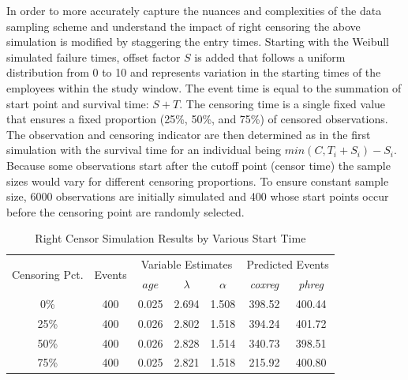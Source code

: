 In order to more accurately capture the nuances and complexities of the data sampling scheme and understand the impact of right censoring the above simulation is modified by staggering the entry times. Starting with the Weibull simulated failure times, offset factor $S$ is added that follows a uniform distribution from 0 to 10 and represents variation in the starting times of the employees within the study window. The event time is equal to the summation of start point and survival time: $S+T$. The censoring time is a single fixed value that ensures a fixed proportion (25\%, 50\%, and 75\%) of censored observations.  The observation and censoring indicator are then determined as in the first simulation with the survival time for an individual being $min(C,T_i+S_i) - S_i$. Because some observations start after the cutoff point (censor time) the sample sizes would vary for different censoring proportions.  To ensure constant sample size, 6000 observations are initially simulated and 400 whose start points occur before the censoring point are randomly selected.
\begin{table}[htbp]
	\renewcommand{\arraystretch}{1.5}
	\scriptsize %
	\centering
	\caption{Right Censor Simulation Results by Various Start Time}
	\begin{tabular}{ccccccc}
		\toprule
		\multicolumn{1}{c}{\multirow{2}{1.5cm}{Censoring Pct.}}  & \multirow{2}[4]{*}{Events} & \multicolumn{3}{c}{Variable Estimates} & \multicolumn{2}{c}{Predicted Events} \\ \cline{3-7}
		&       & $age$   & $\lambda$ & $\alpha$ &\it{coxreg} & \it{phreg}\\
		\midrule
		0\%   & 400   & 0.025 & 2.694 & 1.508 & 398.52 & 400.44 \\
		25\%  & 400   & 0.026 & 2.802 & 1.518 & 394.24 & 401.72 \\
		50\%  & 400   & 0.026 & 2.828 & 1.514 & 340.73 & 398.51 \\
		75\%  & 400   & 0.025 & 2.821 & 1.518 & 215.92 & 400.80 \\
		\bottomrule
	\end{tabular}%
	\label{tab:right2}%
\end{table}%

